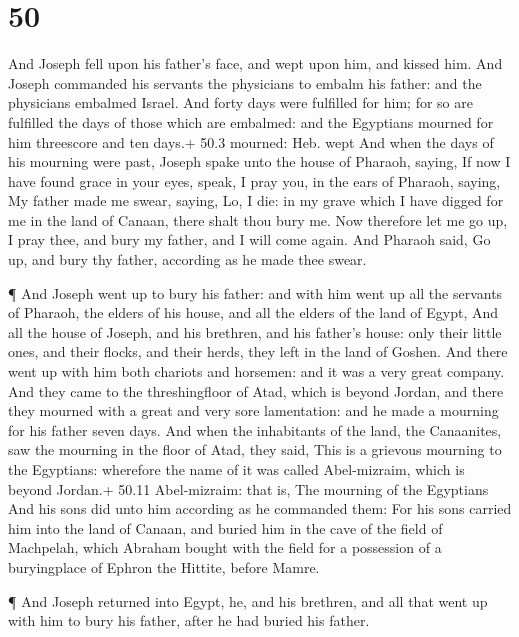 \hypertarget{section-49}{%
\section{50}\label{section-49}}

 And Joseph fell upon his father's face, and wept upon him,
and kissed him.  And Joseph commanded his servants the
physicians to embalm his father: and the physicians embalmed Israel.
 And forty days were fulfilled for him; for so are fulfilled
the days of those which are embalmed: and the Egyptians mourned for him
threescore and ten days.+ 50.3 mourned: Heb. wept  And when
the days of his mourning were past, Joseph spake unto the house of
Pharaoh, saying, If now I have found grace in your eyes, speak, I pray
you, in the ears of Pharaoh, saying,  My father made me
swear, saying, Lo, I die: in my grave which I have digged for me in the
land of Canaan, there shalt thou bury me. Now therefore let me go up, I
pray thee, and bury my father, and I will come again.  And
Pharaoh said, Go up, and bury thy father, according as he made thee
swear.

 ¶ And Joseph went up to bury his father: and with him went
up all the servants of Pharaoh, the elders of his house, and all the
elders of the land of Egypt,  And all the house of Joseph,
and his brethren, and his father's house: only their little ones, and
their flocks, and their herds, they left in the land of Goshen.
 And there went up with him both chariots and horsemen: and
it was a very great company.  And they came to the
threshingfloor of Atad, which is beyond Jordan, and there they mourned
with a great and very sore lamentation: and he made a mourning for his
father seven days.  And when the inhabitants of the land,
the Canaanites, saw the mourning in the floor of Atad, they said, This
is a grievous mourning to the Egyptians: wherefore the name of it was
called Abel-mizraim, which is beyond Jordan.+ 50.11 Abel-mizraim: that
is, The mourning of the Egyptians  And his sons did unto
him according as he commanded them:  For his sons carried
him into the land of Canaan, and buried him in the cave of the field of
Machpelah, which Abraham bought with the field for a possession of a
buryingplace of Ephron the Hittite, before Mamre.

 ¶ And Joseph returned into Egypt, he, and his brethren,
and all that went up with him to bury his father, after he had buried
his father.

